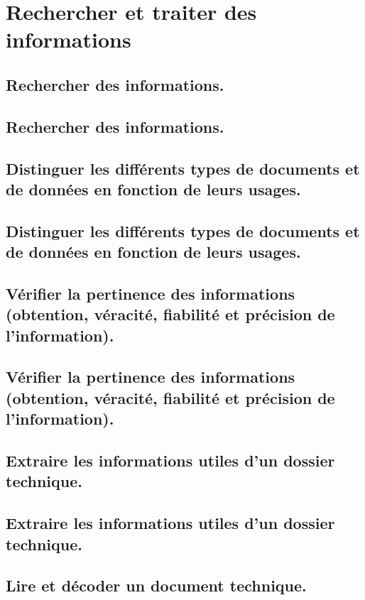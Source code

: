 \documentclass[10pt,fleqn]{book}
\begin{document}
\section{Rechercher et traiter des informations} 

\subsection{Rechercher des informations.} 

\subsection{Rechercher des informations.} 

\subsection{Distinguer les différents types de documents et de données en fonction de leurs usages.} 

\subsection{Distinguer les différents types de documents et de données en fonction de leurs usages.} 

\subsection{Vérifier la pertinence des informations (obtention, véracité, fiabilité et précision de l'information).} 

\subsection{Vérifier la pertinence des informations (obtention, véracité, fiabilité et précision de l'information).} 

\subsection{Extraire les informations utiles d’un dossier technique.} 

\subsection{Extraire les informations utiles d’un dossier technique.} 

\subsection{Lire et décoder un document technique.} 
\end{document}
